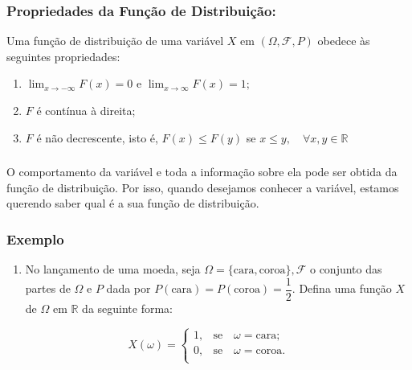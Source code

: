 \documentclass[14pt,aspectratio=1610]{beamer}
\begin{document}
\begin{frame}{}
\frametitle{Propriedades da Função de Distribuição:}
\begin{block}{}
\justifying
Uma função de distribuição de uma variável $X$ em $(\Omega, \mathcal{F}, P)$ obedece às seguintes propriedades:

\begin{enumerate}
\item $\displaystyle \lim_{x \to -\infty}F(x)=0$ e 
      $\displaystyle \lim_{x \to \infty }F(x)=1;$\pause
\item $F$ é contínua à direita;\pause
\item $F$ é não decrescente, isto é, $F(x)\leq F(y)$ se $x\leq y,\quad \forall x,y \in \mathbb{R}$
\end{enumerate}
\end{block}
\end{frame}

\begin{frame}{}
\frametitle{}
\begin{block}{}
\justifying
O comportamento da variável e toda a informação sobre ela pode ser obtida da função de distribuição. Por isso, quando desejamos conhecer a variável, estamos querendo 
saber qual é a sua função de distribuição.
\end{block}
\end{frame}

\begin{frame}{}
\frametitle{Exemplo}
\begin{block}{}
\justifying

\begin{enumerate}
\item No lançamento de uma moeda, seja $\Omega=\{\textrm{cara}, \textrm{coroa}\}, \mathcal{F}$ o conjunto das partes de $\Omega$ e $P$ dada por $P(\textrm{cara})=P(\textrm{coroa})=\dfrac{1}{2}.$ Defina uma função $X$ de $\Omega$ em $\mathbb{R}$ da seguinte forma:
\end{enumerate}


$$
X(\omega)=\left\{
\begin{array}{ccc}
1,& \textrm{se}\quad \omega=\textrm{cara};\\
0,& \textrm{se}\quad \omega=\textrm{coroa}.\\
\end{array}
\right.
$$

\end{block}
\end{frame}
\end{document}

